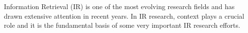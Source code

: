 %
%
Information Retrieval (IR) is one of the most evolving research fields 
and has drawn extensive attention in recent years. 
In IR research, context plays a crucial role and it is the fundamental basis 
of some very important IR research efforts.


